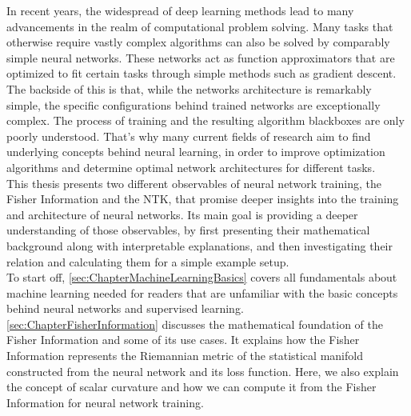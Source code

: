 In recent years, the widespread of deep learning methods lead to many advancements in the realm of computational problem solving. Many tasks that otherwise require vastly complex algorithms can also be solved by comparably simple neural networks. These networks act as function approximators that are optimized to fit certain tasks through simple methods such as gradient descent. The backside of this is that, while the networks architecture is remarkably simple, the specific configurations behind trained networks are exceptionally complex. The process of training and the resulting algorithm blackboxes are only poorly understood. That's why many current fields of research aim to find underlying concepts behind neural learning, in order to improve optimization algorithms and determine optimal network architectures for different tasks.\\
This thesis presents two different observables of neural network training, the Fisher Information and the NTK, that promise deeper insights into the training and architecture of neural networks. Its main goal is providing a deeper understanding of those observables, by first presenting their mathematical background along with interpretable explanations, and then investigating their relation and calculating them for a simple example setup.\\
To start off, \cref{sec:ChapterMachineLearningBasics} covers all fundamentals about machine learning needed for readers that are unfamiliar with the basic concepts behind neural networks and supervised learning.\\
\cref{sec:ChapterFisherInformation} discusses the mathematical foundation of the Fisher Information and some of its use cases. It explains how the Fisher Information represents the Riemannian metric of the statistical manifold constructed from the neural network and its loss function. Here, we also explain the concept of scalar curvature and how we can compute it from the Fisher Information for neural network training. %
